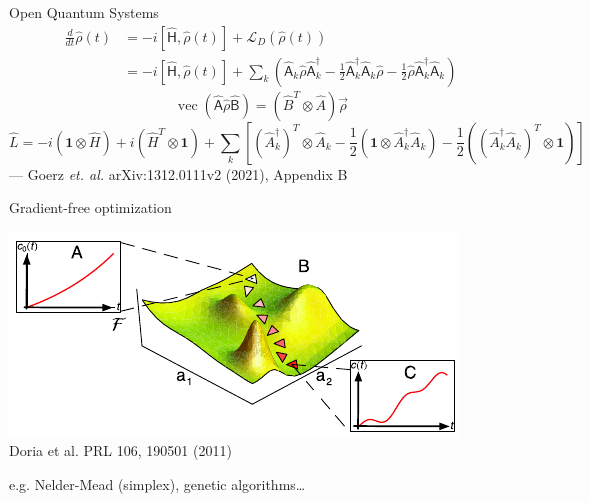 \documentclass[compress, aspectratio=169,usepdftitle=false]{beamer}
\newcommand{\identity}[0]{\mathbf{1}}
\newcommand{\Op}[1]{\ensuremath{\mathsf{\hat{#1}}}}
\def\mat#1{\hat{#1}}
\def\half{ \frac{1}{2}}
\newcommand{\vectorize}{\operatorname{vec}}
\begin{document}
\begin{frame}{Open Quantum Systems}
  \begin{align*}
  \frac{d}{dt}\Op{\rho}(t)
      & =-i\left[\Op{H},\Op{\rho}(t)\right]+\mathcal{L}_{D}(\Op{\rho}(t))\\
      & =-i\left[\Op{H},\Op{\rho}(t)\right]+\sum_{k}\left(\Op{A}_{k}\Op{\rho}\Op{A}_{k}^{\dagger}-\frac{1}{2}\Op{A}_{k}^{\dagger}\Op{A}_{k}\Op{\rho}-\frac{1}{2}\Op{\rho}\Op{A}_{k}^{\dagger}\Op{A}_{k}\right)
  \end{align*}
  \begin{equation*}
    \vectorize\left(\Op{A} \Op{\rho} \Op{B} \right)
    = \left(\mat{B}^{T} \otimes \mat{A}\right) \vec{\rho}
  \end{equation*}
  \begin{equation*}
    \mat{L} =
      -i (\identity \otimes \mat{H}) + i (\mat{H}^T \otimes \identity)
      + \sum_k \left[
        (\mat{A}_k^\dagger)^T \otimes \mat{A}_k
        - \half \left(\identity \otimes \mat{A}_k^\dagger \mat{A}_k\right)
        - \half \left((\mat{A}_k^\dagger \mat{A}_k)^T \otimes \identity\right)
        \right]\
  \end{equation*}
  \hfill {\footnotesize --- Goerz \textit{et. al.} arXiv:1312.0111v2 (2021), Appendix B}
\end{frame}


\begin{frame}{Gradient-free optimization}
  \begin{center}
  \includegraphics{images/nelder_mead}\\
      {\footnotesize\vspace{-2mm}\hspace{-15mm} Doria et al. PRL 106, 190501 (2011)}
  \end{center}
  \vspace{12pt}
  e.g. Nelder-Mead (simplex), genetic algorithms\dots
\end{frame}

\backupend
\end{document}
